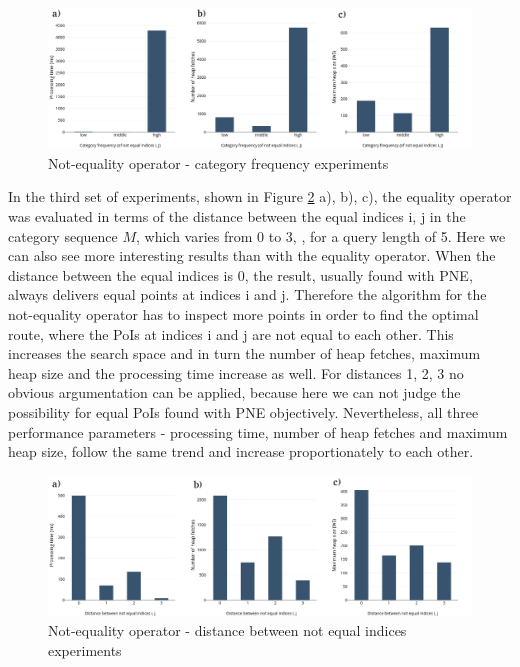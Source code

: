 \begin{figure}[H]
	\includegraphics[scale=0.3]{images/neo_frequency.png}
	\centering
	\caption{Not-equality operator - category frequency experiments}
	\label{fig:neo_frequency}
\end{figure}

In the third set of experiments, shown in Figure \ref{fig:neo_distance} a), b), c), the equality operator was evaluated in terms of the  distance between the equal indices i, j in the category sequence $M$, which varies from 0 to 3, , for a query length of 5.  
Here we can also see more interesting results than with the equality operator. When the distance between the equal indices is 0, the result, usually found with PNE, always delivers equal points at indices i and j. Therefore the algorithm for the not-equality operator has to inspect more points in order to find the optimal route, where the PoIs at indices i and j are not equal to each other. This increases the search space and in turn the number of heap fetches, maximum heap size and the processing time increase as well. For distances 1, 2, 3 no obvious argumentation can be applied, because here we can not judge the possibility for equal PoIs found with PNE objectively.
Nevertheless, all three performance parameters - processing time, number of heap fetches and maximum heap size, follow the same trend and increase proportionately to each other.

\begin{figure}[H]
	\includegraphics[scale=0.3]{images/neo_distance.png}
	\centering
	\caption{Not-equality operator - distance between not equal indices experiments}
	\label{fig:neo_distance}
\end{figure}


